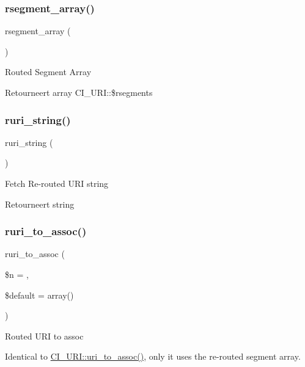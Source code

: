 \subsubsection{\texorpdfstring{rsegment\_array()}{rsegment\_array()}}
{\footnotesize\ttfamily rsegment\+\_\+array (\begin{DoxyParamCaption}{ }\end{DoxyParamCaption})}

Routed Segment Array

\begin{DoxyReturn}{Retourneert}
array C\+I\+\_\+\+U\+R\+I\+::\$rsegments 
\end{DoxyReturn}
\mbox{\label{class_c_i___u_r_i_a53a97a8b68f500980b84e3b060400221}} 
\subsubsection{\texorpdfstring{ruri\_string()}{ruri\_string()}}
{\footnotesize\ttfamily ruri\+\_\+string (\begin{DoxyParamCaption}{ }\end{DoxyParamCaption})}

Fetch Re-\/routed U\+RI string

\begin{DoxyReturn}{Retourneert}
string 
\end{DoxyReturn}
\mbox{\label{class_c_i___u_r_i_a3f375a2026349f1fce7915966eba6d5b}} 
\subsubsection{\texorpdfstring{ruri\_to\_assoc()}{ruri\_to\_assoc()}}
{\footnotesize\ttfamily ruri\+\_\+to\+\_\+assoc (\begin{DoxyParamCaption}\item[{}]{\$n = {},  }\item[{}]{\$default = {\ttfamily array()} }\end{DoxyParamCaption})}

Routed U\+RI to assoc

Identical to \mbox{\hyperlink{class_c_i___u_r_i_a67cca74de71898ee88c167a265cff140}{C\+I\+\_\+\+U\+R\+I\+::uri\+\_\+to\+\_\+assoc()}}, only it uses the re-\/routed segment array.

